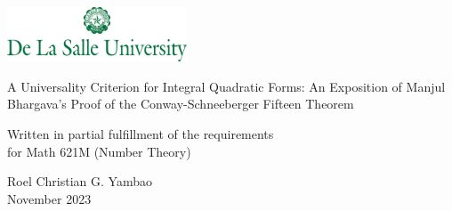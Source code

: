 \thispagestyle{empty}
{\centering



    {
        \includegraphics[width=0.4\textwidth]{assets/dlsu-banner.jpeg}
    }

    \vspace*{1.5in}

    {\Large
       A Universality Criterion for Integral Quadratic Forms: An Exposition of Manjul Bhargava's Proof of the Conway-Schneeberger Fifteen Theorem
    }

    \vspace*{0.5in}


    {
    
       Written in partial fulfillment of the requirements\\
       for Math 621M (Number Theory)
    }

    \vspace*{\fill}

    {
    
    Roel Christian G. Yambao\\
    November 2023
    }
    
}